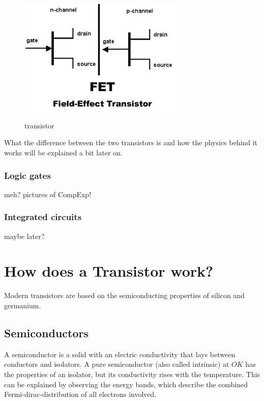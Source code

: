 \documentclass[11pt]{article}
\begin{document}
\begin{figure}[H]
\centering
\includegraphics[width=0.7\textwidth]{transistor}%
\caption{transistor}
\label{fig:transistor}
\end{figure}



What the difference between the two transistors is and how the physics behind it works will be explained a bit later on.


\subsubsection{Logic gates}
meh? pictures of CompExp!

\subsubsection{Integrated circuits}
maybe later?

\newpage
\section{How does a Transistor work?}
Modern transistors are based on the semiconducting properties of silicon and germanium. 
\subsection{Semiconductors}
A semiconductor is a solid with an electric conductivity that lays between conductors and isolators. A pure semiconductor (also called intrinsic) at $OK$ has the properties of an isolator, but its conductivity rises with the temperature. This can be explained by observing the energy bands, which describe the combined Fermi-dirac-distribution of all electrons involved.
\end{document}
